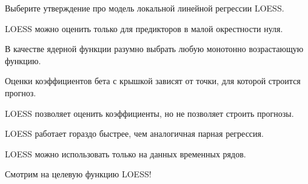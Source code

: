 
\begin{question}
Выберите утверждение про модель локальной линейной регрессии LOESS.
\begin{answerlist}
  \item LOESS можно оценить только для предикторов в малой окрестности нуля.
  \item В качестве ядерной функции разумно выбрать любую монотонно возрастающую функцию.
  \item Оценки коэффициентов бета с крышкой зависят от точки, для которой строится прогноз.
  \item LOESS позволяет оценить коэффициенты, но не позволяет строить прогнозы.
  \item LOESS работает гораздо быстрее, чем аналогичная парная регрессия.
  \item LOESS можно использовать только на данных временных рядов.
\end{answerlist}
\end{question}

\begin{solution}
Смотрим на целевую функцию LOESS!
\end{solution}


